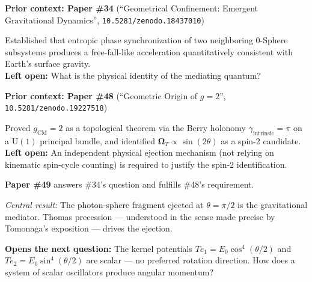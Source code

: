 \documentclass[12pt,letterpaper]{article}
\newcommand{\doilink}[1]{\texttt{#1}}
\begin{document}
\begin{mdframed}[style=chainbox]
\textbf{Prior context: Paper \#34}
(``Geometrical Confinement: Emergent Gravitational Dynamics'',
\doilink{10.5281/zenodo.18437010})\par\vspace{4pt}
Established that entropic phase synchronization of two neighboring 0-Sphere subsystems
produces a free-fall-like acceleration quantitatively consistent with Earth's surface gravity.\\
\textbf{Left open:} What is the physical identity of the mediating quantum?\par\vspace{10pt}

\textbf{Prior context: Paper \#48}
(``Geometric Origin of $g=2$'', \doilink{10.5281/zenodo.19227518})\par\vspace{4pt}
Proved $g_{\mathrm{CM}}=2$ as a topological theorem via the Berry holonomy $\gamma_{\mathrm{intrinsic}}=\pi$
on a $\mathrm{U}(1)$ principal bundle,
and identified $\boldsymbol{\Omega}_T \propto \sin(2\theta)$ as a spin-2 candidate.\\
\textbf{Left open:} An independent physical ejection mechanism (not relying on kinematic
spin-cycle counting) is required to justify the spin-2 identification.
\end{mdframed}

\vspace{0.6cm}

\begin{mdframed}[style=bluebox]
\textbf{\textcolor{threadblue}{Paper \#49}} answers \#34's question and fulfills \#48's requirement.\par\vspace{4pt}
\emph{Central result:} The photon-sphere fragment ejected at $\theta=\pi/2$ is the gravitational mediator.
Thomas precession --- understood in the sense made precise by Tomonaga's exposition \cite{Tomonaga1997} --- drives the ejection.\par\vspace{4pt}
\textbf{Opens the next question:} The kernel potentials $Te_1 = E_0\cos^4(\theta/2)$
and $Te_2 = E_0\sin^4(\theta/2)$ are scalar --- no preferred rotation direction.
How does a system of scalar oscillators produce angular momentum?
\end{mdframed}

\vspace{0.3cm}
\end{document}
